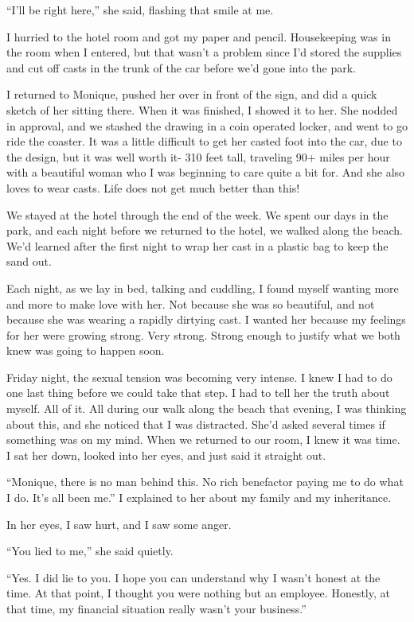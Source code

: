 ``I'll be right here,'' she said, flashing that smile at me.

I hurried to the hotel room and got my paper and pencil. Housekeeping was in the room when
I entered, but that wasn't a problem since I'd stored the supplies and cut off casts in the
trunk of the car before we'd gone into the park.

I returned to Monique, pushed her over in front of the sign, and did a quick sketch of her
sitting there. When it was finished, I showed it to her. She nodded in approval, and we stashed
the drawing in a coin operated locker, and went to go ride the coaster. It was a little
difficult to get her casted foot into the car, due to the design, but it was well worth it- 310
feet tall, traveling 90+ miles per hour with a beautiful woman who I was beginning to care quite
a bit for. And she also loves to wear casts. Life does not get much better than this!

We stayed at the hotel through the end of the week. We spent our days in the park, and each
night before we returned to the hotel, we walked along the beach. We'd learned after the first
night to wrap her cast in a plastic bag to keep the sand out.

Each night, as we lay in bed, talking and cuddling, I found myself wanting more and more to
make love with her. Not because she was so beautiful, and not because she was wearing a rapidly
dirtying cast. I wanted her because my feelings for her were growing strong. Very strong. Strong
enough to justify what we both knew was going to happen soon.

Friday night, the sexual tension was becoming very intense. I knew I had to do one last
thing before we could take that step. I had to tell her the truth about myself. All of it. All
during our walk along the beach that evening, I was thinking about this, and she noticed that I
was distracted. She'd asked several times if something was on my mind. When we returned to our
room, I knew it was time. I sat her down, looked into her eyes, and just said it straight out.

``Monique, there is no man behind this. No rich benefactor paying me to do what I do. It's
all been me.'' I explained to her about my family and my inheritance.

In her eyes, I saw hurt, and I saw some anger.

``You lied to me,'' she said quietly.

``Yes. I did lie to you. I hope you can understand why I wasn't honest at the time. At that
point, I thought you were nothing but an employee. Honestly, at that time, my financial
situation really wasn't your business.''

